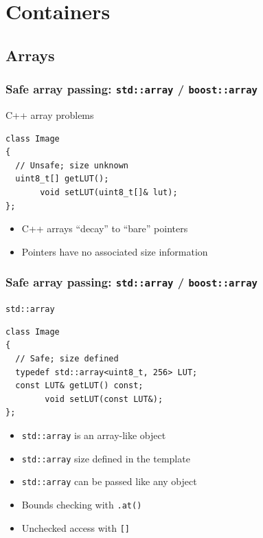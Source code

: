 \documentclass[handout]{beamer}
\begin{document}
\section{Containers}
\subsection{Arrays}
\begin{frame}[fragile]
  \frametitle{Safe array passing: \texttt{std::array} / \texttt{boost::array}}
  \begin{block}{C++ array problems}
  \begin{lstlisting}
class Image
{
  // Unsafe; size unknown
  uint8_t[] getLUT();
       void setLUT(uint8_t[]& lut);
};
\end{lstlisting}
  \begin{itemize}
  \item C++ arrays “decay” to “bare” pointers
  \item Pointers have no associated size information
  \end{itemize}
  \end{block}
\end{frame}

\begin{frame}[fragile]
  \frametitle{Safe array passing: \texttt{std::array} / \texttt{boost::array}}
  \begin{block}{\texttt{std::array}}
  \begin{lstlisting}
class Image
{
  // Safe; size defined
  typedef std::array<uint8_t, 256> LUT;
  const LUT& getLUT() const;
        void setLUT(const LUT&);
};
\end{lstlisting}
  \begin{itemize}
  \item<1-> \texttt{std::array} is an array-like object
  \item<2-> \texttt{std::array} size defined in the template
  \item<3-> \texttt{std::array} can be passed like any object
  \item<4-> Bounds checking with \texttt{.at()}
  \item<4-> Unchecked access with \texttt{[]}
  \end{itemize}
  \end{block}
\end{frame}
\end{document}
